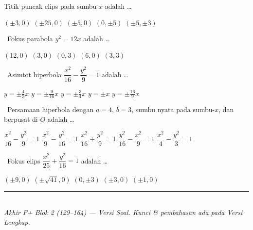 \documentclass[11pt,a4paper]{exam}
\newcommand{\Inter}{{\footnotesize\textsf{\textcolor{biru}{[Intermediate]}}}\ }
\newcommand{\Adv}{{\footnotesize\textsf{\textcolor{oranye}{[Advanced]}}}\ }
\newcommand{\Exp}{{\footnotesize\textsf{\textcolor{ungu}{[Expert]}}}\ }
\begin{document}
\begin{questions}
Titik puncak elips pada sumbu-$x$ adalah \dots
\begin{choices}
\choice $(\pm 3, 0)$ \choice $(\pm 25, 0)$ \CorrectChoice $(\pm 5, 0)$
\choice $(0, \pm 5)$ \choice $(\pm 5, \pm 3)$
\end{choices}

\question \Inter Fokus parabola $y^{2} = 12x$ adalah \dots
\begin{choices}
\choice $(12,0)$ \CorrectChoice $(3,0)$ \choice $(0,3)$ \choice $(6,0)$ \choice $(3,3)$
\end{choices}

\question \Adv Asimtot hiperbola $\dfrac{x^{2}}{16} - \dfrac{y^{2}}{9} = 1$ adalah \dots
\begin{choices}
\choice $y = \pm\tfrac{4}{3}x$ \choice $y = \pm\tfrac{9}{16}x$ \CorrectChoice $y = \pm\tfrac{3}{4}x$
\choice $y = \pm x$ \choice $y = \pm\tfrac{16}{9}x$
\end{choices}

\question \Adv Persamaan hiperbola dengan $a=4$, $b=3$, sumbu nyata pada sumbu-$x$,
dan berpusat di $O$ adalah \dots
\begin{choices}
\CorrectChoice $\dfrac{x^{2}}{16} - \dfrac{y^{2}}{9} = 1$
\choice $\dfrac{x^{2}}{9} - \dfrac{y^{2}}{16} = 1$
\choice $\dfrac{x^{2}}{16} + \dfrac{y^{2}}{9} = 1$
\choice $\dfrac{y^{2}}{16} - \dfrac{x^{2}}{9} = 1$
\choice $\dfrac{x^{2}}{4} - \dfrac{y^{2}}{3} = 1$
\end{choices}

\question \Exp Fokus elips $\dfrac{x^{2}}{25} + \dfrac{y^{2}}{16} = 1$ adalah \dots
\begin{choices}
\choice $(\pm 9, 0)$ \choice $(\pm\sqrt{41}, 0)$ \choice $(0, \pm 3)$
\CorrectChoice $(\pm 3, 0)$ \choice $(\pm 1, 0)$
\end{choices}

\end{questions}

\vspace{6pt}
\begin{center}
{\color{biru}\rule{\linewidth}{1pt}}\\[3pt]
{\small\textit{Akhir F+ Blok 2 (129–164) — Versi Soal. Kunci \& pembahasan ada pada Versi Lengkap.}}
\end{center}
\end{document}
